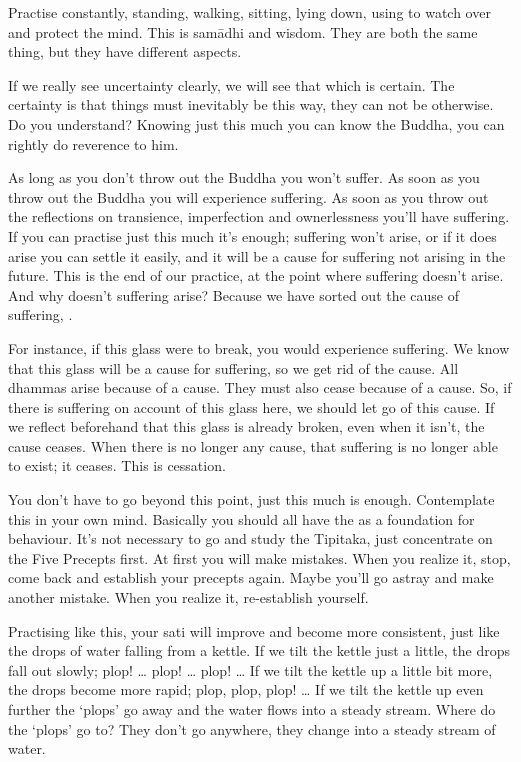 Practise constantly, standing, walking, sitting, lying down, using  to watch over and protect the mind. This is sam\=adhi and wisdom. They are both the same thing, but they have different aspects.

If we really see uncertainty clearly, we will see that which is certain. The certainty is that things must inevitably be this way, they can not be otherwise. Do you understand? Knowing just this much you can know the Buddha, you can rightly do reverence to him.

As long as you don't throw out the Buddha you won't suffer. As soon as you throw out the Buddha you will experience suffering. As soon as you throw out the reflections on transience, imperfection and ownerlessness you'll have suffering. If you can practise just this much it's enough; suffering won't arise, or if it does arise you can settle it easily, and it will be a cause for suffering not arising in the future. This is the end of our practice, at the point where suffering doesn't arise. And why doesn't suffering arise? Because we have sorted out the cause of suffering, .

For instance, if this glass were to break, you would experience suffering. We know that this glass will be a cause for suffering, so we get rid of the cause. All dhammas arise because of a cause. They must also cease because of a cause. So, if there is suffering on account of this glass here, we should let go of this cause. If we reflect beforehand that this glass is already broken, even when it isn't, the cause ceases. When there is no longer any cause, that suffering is no longer able to exist; it ceases. This is cessation.

You don't have to go beyond this point, just this much is enough. Contemplate this in your own mind. Basically you should all have the  as a foundation for behaviour. It's not necessary to go and study the Tipitaka, just concentrate on the Five Precepts first. At first you will make mistakes. When you realize it, stop, come back and establish your precepts again. Maybe you'll go astray and make another mistake. When you realize it, re-establish yourself.

Practising like this, your sati will improve and become more consistent, just like the drops of water falling from a kettle. If we tilt the kettle just a little, the drops fall out slowly; plop! \ldots{} plop! \ldots{} plop! \ldots{} If we tilt the kettle up a little bit more, the drops become more rapid; plop, plop, plop! \ldots{} If we tilt the kettle up even further the `plops' go away and the water flows into a steady stream. Where do the `plops' go to? They don't go anywhere, they change into a steady stream of water.

